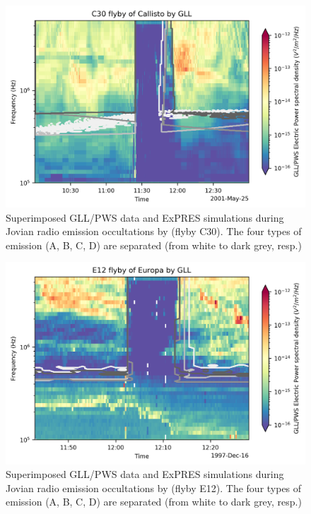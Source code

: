\documentclass[referee]{aa}
\begin{document}
\begin{figure}
    \centering
    \includegraphics[width=0.99\linewidth]{Moon_flyby_galileo_occultation_data_simu_C30.png}
    \caption{Superimposed GLL/PWS data and ExPRES simulations during Jovian radio emission occultations by  (flyby C30). The four types of emission (A, B, C, D) are separated (from white to dark grey, resp.)}
    \label{fig:flyby_occultation_C30}
\end{figure}


\begin{figure}
    \centering
    \includegraphics[width=0.99\linewidth]{Moon_flyby_galileo_occultation_data_simu_E12.png}
    \caption{Superimposed GLL/PWS data and ExPRES simulations during Jovian radio emission occultations by  (flyby E12). The four types of emission (A, B, C, D) are separated (from white to dark grey, resp.)}
    \label{fig:flyby_occultation_E12}
\end{figure}
\end{document}

